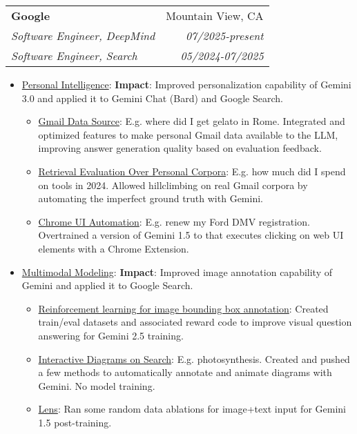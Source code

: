 \documentclass[letterpaper,9pt]{article}
\makeatletter
\newcommand{\resumeItem}[2]{
    \item\small{
        \underline{#1}{: #2 \vspace{-2pt}}
    }
}
\newcommand{\resumeDoubleSubheading}[6]{
    \vspace{-1pt}\item
    \begin{tabular*}{0.97\textwidth}[t]{l@{\extracolsep{\fill}}r}
        \textbf{#1} & #2 \\
        \textit{\small#3} & \textit{\small #4} \\
        \textit{\small#5} & \textit{\small #6} \\
    \end{tabular*}\vspace{-5pt}
}
\newcommand{\resumeItemListStart}{\begin{itemize}}
\newcommand{\resumeItemListEnd}{\end{itemize}\vspace{-5pt}}
\makeatother
\begin{document}
    \resumeDoubleSubheading
      {Google}{Mountain View, CA}
      {Software Engineer, DeepMind}{07/2025-present}
      {Software Engineer, Search}{05/2024-07/2025}
      \resumeItemListStart
        \resumeItem{Personal Intelligence}
          {
              \newline \textbf{Impact}: Improved personalization capability of Gemini 3.0 and applied it to Gemini Chat (Bard) and Google Search.
          }
          \resumeItemListStart
            \resumeItem{Gmail Data Source}{E.g. where did I get gelato in Rome. Integrated and optimized features to make personal Gmail data available to the LLM, improving answer generation quality based on evaluation feedback.}
            \resumeItem{Retrieval Evaluation Over Personal Corpora}{E.g. how much did I spend on tools in 2024. Allowed hillclimbing on real Gmail corpora by automating the imperfect ground truth with Gemini.}
            \resumeItem{Chrome UI Automation}{E.g. renew my Ford DMV registration. Overtrained a version of Gemini 1.5 to that executes clicking on web UI elements with a Chrome Extension.}
          \resumeItemListEnd
          \vspace{4pt}
        \resumeItem{Multimodal Modeling}
          {
              \newline \textbf{Impact}: Improved image annotation capability of Gemini and applied it to Google Search.
          }
          \resumeItemListStart
            \resumeItem{Reinforcement learning for image bounding box annotation}{Created train/eval datasets and associated reward code to improve visual question answering for Gemini 2.5 training.}
            \resumeItem{Interactive Diagrams on Search}{E.g. photosynthesis. Created and pushed a few methods to automatically annotate and animate diagrams with Gemini. No model training.}
            \resumeItem{Lens}{Ran some random data ablations for image+text input for Gemini 1.5 post-training.}
          \resumeItemListEnd
          \vspace{4pt}
      \resumeItemListEnd
\end{document}
